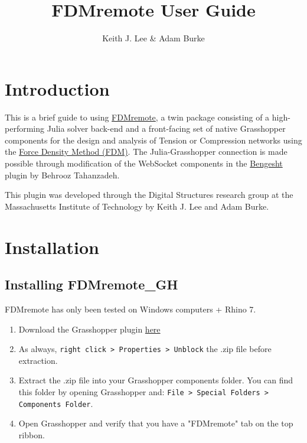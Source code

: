 \documentclass{ol-softwaremanual}
\title{FDMremote User Guide}
\author{Keith J. Lee \& Adam Burke}
\begin{document}
\maketitle

\tableofcontents
\newpage

\section{Introduction}
This is a brief guide to using \href{https://github.com/keithjlee/FDMremote_GH}{FDMremote}, a twin package consisting of a high-performing Julia solver back-end and a front-facing set of native Grasshopper components for the design and analysis of Tension or Compression networks using the \href{https://www.sciencedirect.com/science/article/abs/pii/0045782574900450}{Force Density Method (FDM)}. The Julia-Grasshopper connection is made possible through modification of the WebSocket components in 
 the \href{https://www.food4rhino.com/en/app/bengesht}{Bengesht} plugin by Behrooz Tahanzadeh.

This plugin was developed through the Digital Structures research group at the Massachusetts Institute of Technology by Keith J. Lee and Adam Burke. 

\section{Installation} \label{sec:installation}

\subsection{Installing FDMremote\_GH} \label{installgh}
\begin{center}
    {\color{kpink} FDMremote has only been tested on Windows computers + Rhino 7.}
\end{center}

\begin{enumerate}
    \item Download the Grasshopper plugin \href{https://www.food4rhino.com/en/app/fdmremote?lang=en}{here}
    \item As always, \texttt{right click > Properties > Unblock} the .zip file before extraction.
    \item Extract the .zip file into your Grasshopper components folder. You can find this folder by opening Grasshopper and: \texttt{File > Special Folders > Components Folder}.
    \item Open Grasshopper and verify that you have a "FDMremote" tab on the top ribbon.
\end{enumerate}
\end{document}
